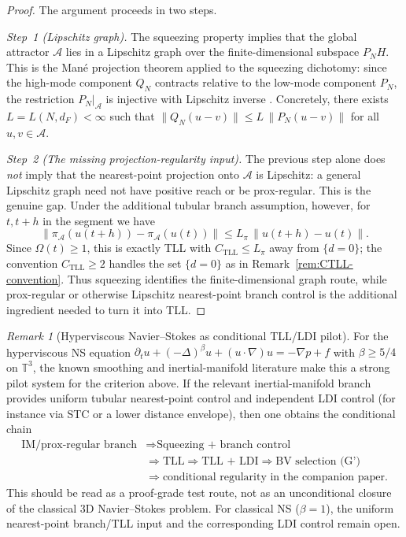 \documentclass[12pt,a4paper]{article}
\theoremstyle{definition}
\theoremstyle{plain}
\theoremstyle{remark}
\newtheorem{remark}[definition]{Remark}
\begin{document}
\begin{proof}
The argument proceeds in two steps.

\emph{Step~1 (Lipschitz graph).}
The squeezing property implies that the global attractor $\mathcal{A}$
lies in a Lipschitz graph over the finite-dimensional subspace $P_N H$.
This is the Mané projection theorem applied to the squeezing dichotomy:
since the high-mode component $Q_N$ contracts relative to the low-mode
component $P_N$, the restriction $P_N|_{\mathcal{A}}$ is injective with
Lipschitz inverse \cite{FoiasTemam1979,Mane1981}.
Concretely, there exists $L = L(N, d_F) < \infty$ such that
$\|Q_N(u - v)\| \leq L\,\|P_N(u - v)\|$ for all $u, v \in \mathcal{A}$.

\emph{Step~2 (The missing projection-regularity input).}
The previous step alone does \emph{not} imply that the nearest-point
projection onto $\mathcal{A}$ is Lipschitz: a general Lipschitz graph
need not have positive reach or be prox-regular.  This is the genuine
gap.  Under the additional tubular branch assumption, however, for
$t,t+h$ in the segment we have
\[
  \|\pi_{\mathcal{A}}(u(t+h))-\pi_{\mathcal{A}}(u(t))\|
  \le L_\pi\,\|u(t+h)-u(t)\|.
\]
Since $\Omega(t)\ge 1$, this is exactly TLL with
$C_{\mathrm{TLL}}\le L_\pi$ away from $\{d=0\}$; the convention
$C_{\mathrm{TLL}}\ge 2$ handles the set $\{d=0\}$ as in
Remark~\ref{rem:CTLL-convention}.  Thus squeezing identifies the
finite-dimensional graph route, while prox-regular or otherwise
Lipschitz nearest-point branch control is the additional ingredient
needed to turn it into TLL.
\end{proof}

\begin{remark}[Hyperviscous Navier--Stokes as conditional TLL/LDI pilot]
\label{rem:hyperviscous}
For the hyperviscous NS equation $\partial_t u + (-\Delta)^\beta u + (u\cdot\nabla)u = -\nabla p + f$
with $\beta \geq 5/4$ on $\mathbb{T}^3$, the known smoothing and
inertial-manifold literature make this a strong pilot system for the
criterion above.  If the relevant inertial-manifold branch provides
uniform tubular nearest-point control and independent LDI control
(for instance via STC or a lower distance envelope), then
one obtains the conditional chain
\[
\begin{aligned}
  \text{IM/prox-regular branch}
  &\Rightarrow \text{Squeezing + branch control}\\
  &\Rightarrow \text{TLL}
  \Rightarrow \text{TLL + LDI}
  \Rightarrow \text{BV selection (G')}\\
  &\Rightarrow \text{conditional regularity in the companion paper}.
\end{aligned}
\]
This should be read as a proof-grade test route, not as an
unconditional closure of the classical 3D Navier--Stokes problem.
For classical NS ($\beta = 1$), the uniform nearest-point branch/TLL
input and the corresponding LDI control remain open.
\end{remark}
\end{document}
